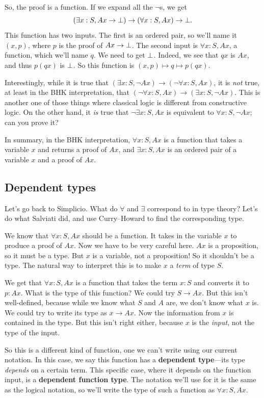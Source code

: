 \documentclass[11pt,paper=letter]{scrartcl}
\renewcommand{\lnot}{\neg}
\begin{document}
So, the proof is a function. If we expand all the $\lnot$s, we get \[
(\exists x: S, Ax \to \bot) \to (\forall x: S, Ax) \to \bot.\] This function has two inputs. The first is an ordered pair, so we'll name it $(x, p)$, where $p$ is the proof of $Ax \to \bot$. The second input is $\forall x: S, Ax$, a function, which we'll name $q$. We need to get $\bot$. Indeed, we see that $qx$ is $Ax$, and thus $p(qx)$ is $\bot$. So this function is $(x, p) \mapsto q \mapsto p(qx)$.

Interestingly, while it is true that $(\exists x: S, \lnot Ax) \to (\lnot \forall x:S, Ax)$, it is \emph{not} true, at least in the BHK interpretation, that $(\lnot \forall x:S, Ax) \to (\exists x: S, \lnot Ax)$. This is another one of those things where classical logic is different from constructive logic. On the other hand, it \emph{is} true that $\lnot \exists x: S, Ax$ is equivalent to $\forall x: S, \lnot Ax$; can you prove it?

In summary, in the BHK interpretation, $\forall x:S, Ax$ is a function that takes a variable $x$ and returns a proof of $Ax$, and $\exists x:S, Ax$ is an ordered pair of a variable $x$ and a proof of $Ax$.

\subsection{Dependent types}

Let's go back to Simplicio. What do $\forall$ and $\exists$ correspond to in type theory? Let's do what Salviati did, and use Curry--Howard to find the corresponding type.

We know that $\forall x:S, Ax$ should be a function. It takes in the variable $x$ to produce a proof of $Ax$. Now we have to be very careful here. $Ax$ is a proposition, so it must be a type. But $x$ is a variable, not a proposition! So it shouldn't be a type. The natural way to interpret this is to make $x$ a \emph{term} of type $S$.

We get that $\forall x: S, Ax$ is a function that takes the term $x : S$ and converts it to $p : Ax$. What is the type of this function? We could try $S \to Ax$. But this isn't well-defined, because while we know what $S$ and $A$ are, we don't know what $x$ is. We could try to write its type as $x \to Ax$. Now the information from $x$ is contained in the type. But this isn't right either, because $x$ is the \emph{input}, not the type of the input.

So this is a different kind of function, one we can't write using our current notation. In this case, we say this function has a \textbf{dependent type}---its type \emph{depends} on a certain term. This specific case, where it depends on the function input, is a \textbf{dependent function type}. The notation we'll use for it is the same as the logical notation, so we'll write the type of such a function as $\forall x: S, Ax$.
\end{document}
